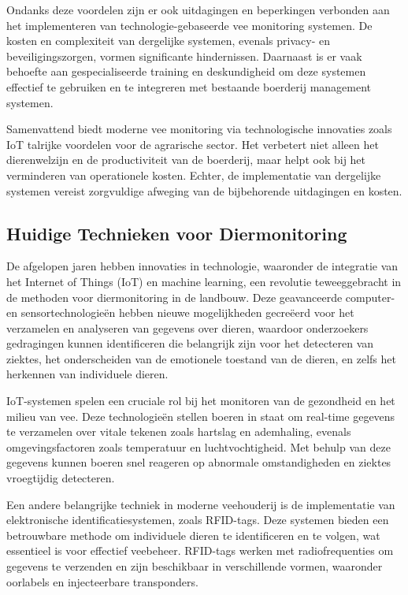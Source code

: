Ondanks deze voordelen zijn er ook uitdagingen en beperkingen verbonden aan het implementeren van technologie-gebaseerde vee monitoring systemen. De kosten en complexiteit van dergelijke systemen, evenals privacy- en beveiligingszorgen, vormen significante hindernissen. Daarnaast is er vaak behoefte aan gespecialiseerde training en deskundigheid om deze systemen effectief te gebruiken en te integreren met bestaande boerderij management systemen\autocite{ToAgriculture}\autocite{IntuzIoT}.

Samenvattend biedt moderne vee monitoring via technologische innovaties zoals IoT talrijke voordelen voor de agrarische sector. Het verbetert niet alleen het dierenwelzijn en de productiviteit van de boerderij, maar helpt ook bij het verminderen van operationele kosten. Echter, de implementatie van dergelijke systemen vereist zorgvuldige afweging van de bijbehorende uitdagingen en kosten.

\subsection{Huidige Technieken voor Diermonitoring}
De afgelopen jaren hebben innovaties in technologie, waaronder de integratie van het Internet of Things (IoT) en machine learning, een revolutie teweeggebracht in de methoden voor diermonitoring in de landbouw. Deze geavanceerde computer- en sensortechnologieën hebben nieuwe mogelijkheden gecreëerd voor het verzamelen en analyseren van gegevens over dieren, waardoor onderzoekers gedragingen kunnen identificeren die belangrijk zijn voor het detecteren van ziektes, het onderscheiden van de emotionele toestand van de dieren, en zelfs het herkennen van individuele dieren\autocite{MDPI}.

IoT-systemen spelen een cruciale rol bij het monitoren van de gezondheid en het milieu van vee. Deze technologieën stellen boeren in staat om real-time gegevens te verzamelen over vitale tekenen zoals hartslag en ademhaling, evenals omgevingsfactoren zoals temperatuur en luchtvochtigheid. Met behulp van deze gegevens kunnen boeren snel reageren op abnormale omstandigheden en ziektes vroegtijdig detecteren\autocite{IntuzIoT}.

Een andere belangrijke techniek in moderne veehouderij is de implementatie van elektronische identificatiesystemen, zoals RFID-tags. Deze systemen bieden een betrouwbare methode om individuele dieren te identificeren en te volgen, wat essentieel is voor effectief veebeheer. RFID-tags werken met radiofrequenties om gegevens te verzenden en zijn beschikbaar in verschillende vormen, waaronder oorlabels en injecteerbare transponders\autocite{IntechOpen}.

